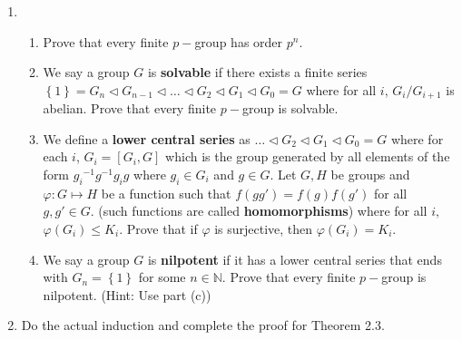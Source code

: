 \documentclass[letterpaper,12pt]{article}
\newcommand{\set}[1]{\left\{ #1 \right\}}
\begin{document}
\begin{enumerate}
\begin{enumerate}
\end{enumerate}
\item \begin{enumerate}
    \item Prove that every finite $p-$group has order $p^n$.
    \item We say a group $G$ is \textbf{solvable} if there exists a finite series $\set{1} = G_n \triangleleft G_{n-1} \triangleleft \ldots \triangleleft G_2 \triangleleft G_1 \triangleleft G_0 = G$ where for all $i$, $G_i/G_{i+1}$ is abelian. Prove that every finite $p-$group is solvable.
    \item We define a \textbf{lower central series} as $\ldots \triangleleft G_2 \triangleleft G_1 \triangleleft G_0 = G$ where for each $i$, $G_i = [G_i,G]$ which is the group generated by all elements of the form ${g_i}^{-1}g^{-1}g_ig$ where $g_i \in G_i$ and $g \in G$. Let $G,H$ be groups and $\varphi: G \mapsto H$ be a function such that $f(gg')=f(g)f(g')$ for all $g,g' \in G$. (such functions are called \textbf{homomorphisms}) where for all $i,$ $\varphi(G_i)\leq K_i$. Prove that if $\varphi$ is surjective, then $\varphi(G_i)=K_i$.
    \item We say a group $G$ is \textbf{nilpotent} if it has a lower central series that ends with $G_n = \set{1}$ for some $n \in \mathbb{N}$. Prove that every finite $p-$group is nilpotent. (Hint: Use part (c))
\end{enumerate}
\item Do the actual induction and complete the proof for Theorem 2.3.
\end{enumerate}
\end{document}
